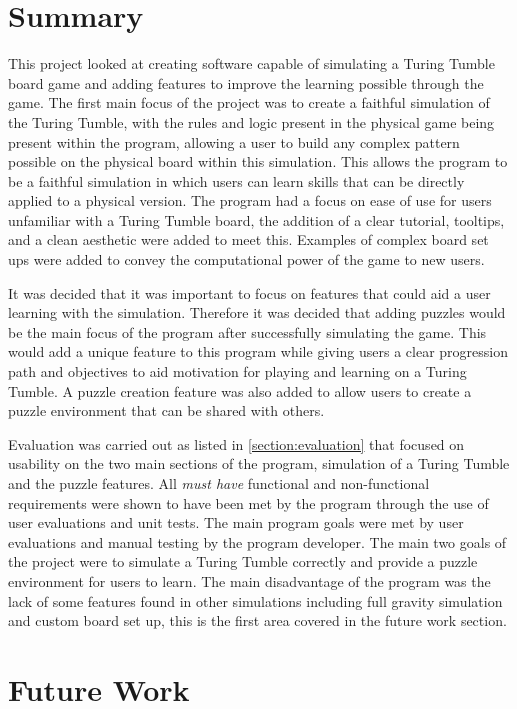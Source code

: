 \documentclass{l4proj}
\begin{document}
\section{Summary}
This project looked at creating software capable of simulating a Turing Tumble board game and adding features to improve the learning possible through the game. The first main focus of the project was to create a faithful simulation of the Turing Tumble, with the rules and logic present in the physical game being present within the program, allowing a user to build any complex pattern possible on the physical board within this simulation. This allows the program to be a faithful simulation in which users can learn skills that can be directly applied to a physical version. The program had a focus on ease of use for users unfamiliar with a Turing Tumble board, the addition of a clear tutorial, tooltips, and a clean aesthetic were added to meet this. Examples of complex board set ups were added to convey the computational power of the game to new users. 

It was decided that it was important to focus on features that could aid a user learning with the simulation. Therefore it was decided that adding puzzles would be the main focus of the program after successfully simulating the game. This would add a unique feature to this program while giving users a clear progression path and objectives to aid motivation for playing and learning on a Turing Tumble. A puzzle creation feature was also added to allow users to create a puzzle environment that can be shared with others. 

Evaluation was carried out as listed in \ref{section:evaluation} that focused on usability on the two main sections of the program, simulation of a Turing Tumble and the puzzle features. All \emph{must have} functional and non-functional requirements were shown to have been met by the program through the use of user evaluations and unit tests. The main program goals were met by user evaluations and manual testing by the program developer. The main two goals of the project were to simulate a Turing Tumble correctly and provide a puzzle environment for users to learn. The main disadvantage of the program was the lack of some features found in other simulations including full gravity simulation and custom board set up, this is the first area covered in the future work section.

\section{Future Work}
\end{document}
